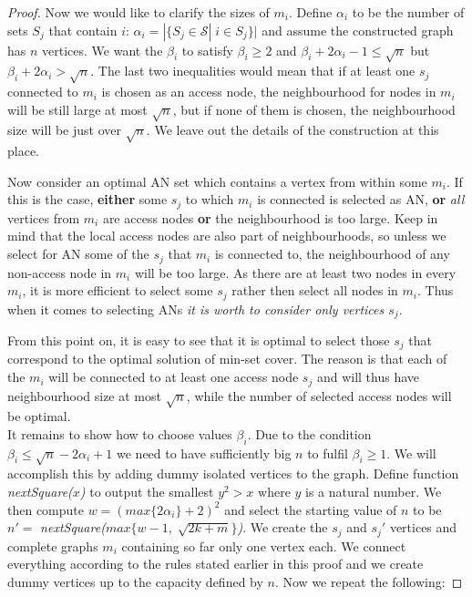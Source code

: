 \begin{proof}
			\noindent Now we would like to clarify the sizes of $m_{i}$. Define $\alpha_{i}$ to be the number of sets $S_{j}$ that contain $i$: $\alpha_{i} = |\{S_{j} \in \mathcal{S}| \; i \in S_{j}\}|$ and assume the constructed graph has $n$ vertices. We want the $\beta_{i}$ to satisfy $\beta_{i} \geq 2$ and $\beta_{i} + 2\alpha_{i} - 1 \leq \sqrt{n}$ but $\beta_{i} + 2\alpha_{i} > \sqrt{n}$. The last two inequalities would mean that if at least one $s_{j}$ connected to $m_{i}$ is chosen as an access node, the neighbourhood for nodes in $m_{i}$ will be still large at most $\sqrt{n}$, but if none of them is chosen, the neighbourhood size will be just over $\sqrt{n}$. We leave out the details of the construction at this place. 
			
			Now consider an optimal AN set which contains a vertex from within some $m_{i}$. If this is the case, \textbf{either} some $s_{j}$ to which $m_{i}$ is connected is selected as AN, \textbf{or} \textit{all} vertices from $m_{i}$ are access nodes \textbf{or} the neighbourhood is too large. Keep in mind that the local access nodes are also part of neighbourhoods, so unless we select for AN some of the $s_{j}$ that $m_{i}$ is connected to, the neighbourhood of any non-access node in $m_{i}$ will be too large. As there are at least two nodes in every $m_{i}$, it is more efficient to select some $s_{j}$ rather then select all nodes in $m_{i}$. Thus when it comes to selecting ANs \textit{it is worth to consider only vertices $s_{j}$}.
			
			From this point on, it is easy to see that it is optimal to select those $s_{j}$ that correspond to the optimal solution of min-set cover. The reason is that each of the $m_{i}$ will be connected to at least one access node $s_{j}$ and will thus have neighbourhood size at most $\sqrt{n}$, while the number of selected access nodes will be optimal. \\
			
			\noindent It remains to show how to choose values $\beta_{i}$. Due to the condition $\beta_{i} \leq \sqrt{n} - 2\alpha_{i} + 1$ we need to have sufficiently big $n$ to fulfil $\beta_{i} \geq 1$. We will accomplish this by adding dummy isolated vertices to the graph. Define function \textit{nextSquare($x$)} to output the smallest $y^{2} > x$ where $y$ is a natural number. We then compute $w = (max\{2\alpha_{i}\} + 2)^{2}$ and select the starting value of $n$ to be $n' =$ \textit{nextSquare($max\{w - 1, \; \sqrt{2k + m}\}$)}. We create the $s_{j}$ and $s_{j}'$ vertices and complete graphs $m_{i}$ containing so far only one vertex each. We connect everything according to the rules stated earlier in this proof and we create dummy vertices up to the capacity defined by $n$. Now we repeat the following:
			

\end{proof}
